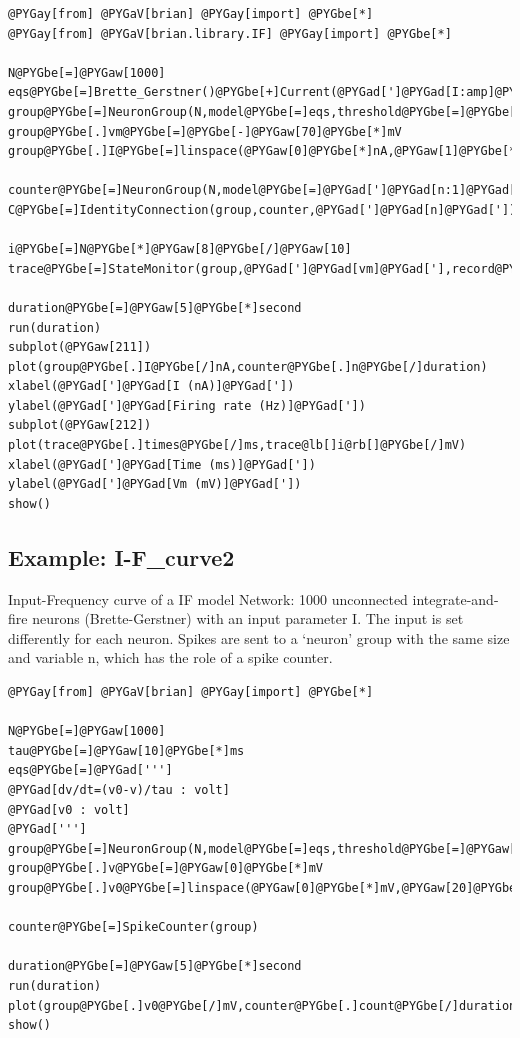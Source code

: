 \documentclass[letterpaper,10pt]{manual}
\begin{document}
\begin{Verbatim}[commandchars=@\[\]]
@PYGay[from] @PYGaV[brian] @PYGay[import] @PYGbe[*]
@PYGay[from] @PYGaV[brian.library.IF] @PYGay[import] @PYGbe[*]

N@PYGbe[=]@PYGaw[1000]
eqs@PYGbe[=]Brette_Gerstner()@PYGbe[+]Current(@PYGad[']@PYGad[I:amp]@PYGad['])
group@PYGbe[=]NeuronGroup(N,model@PYGbe[=]eqs,threshold@PYGbe[=]@PYGbe[-]@PYGaw[20]@PYGbe[*]mV,reset@PYGbe[=]AdaptiveReset())
group@PYGbe[.]vm@PYGbe[=]@PYGbe[-]@PYGaw[70]@PYGbe[*]mV
group@PYGbe[.]I@PYGbe[=]linspace(@PYGaw[0]@PYGbe[*]nA,@PYGaw[1]@PYGbe[*]nA,N)

counter@PYGbe[=]NeuronGroup(N,model@PYGbe[=]@PYGad[']@PYGad[n:1]@PYGad['])
C@PYGbe[=]IdentityConnection(group,counter,@PYGad[']@PYGad[n]@PYGad['])

i@PYGbe[=]N@PYGbe[*]@PYGaw[8]@PYGbe[/]@PYGaw[10]
trace@PYGbe[=]StateMonitor(group,@PYGad[']@PYGad[vm]@PYGad['],record@PYGbe[=]i)

duration@PYGbe[=]@PYGaw[5]@PYGbe[*]second
run(duration)
subplot(@PYGaw[211])
plot(group@PYGbe[.]I@PYGbe[/]nA,counter@PYGbe[.]n@PYGbe[/]duration)
xlabel(@PYGad[']@PYGad[I (nA)]@PYGad['])
ylabel(@PYGad[']@PYGad[Firing rate (Hz)]@PYGad['])
subplot(@PYGaw[212])
plot(trace@PYGbe[.]times@PYGbe[/]ms,trace@lb[]i@rb[]@PYGbe[/]mV)
xlabel(@PYGad[']@PYGad[Time (ms)]@PYGad['])
ylabel(@PYGad[']@PYGad[Vm (mV)]@PYGad['])
show()
\end{Verbatim}

\resetcurrentobjects
{}

\hypertarget{index-24}{}\subsection{Example: I-F\_curve2}

Input-Frequency curve of a IF model
Network: 1000 unconnected integrate-and-fire neurons (Brette-Gerstner)
with an input parameter I.
The input is set differently for each neuron.
Spikes are sent to a `neuron' group with the same size and variable n,
which has the role of a spike counter.

\begin{Verbatim}[commandchars=@\[\]]
@PYGay[from] @PYGaV[brian] @PYGay[import] @PYGbe[*]

N@PYGbe[=]@PYGaw[1000]
tau@PYGbe[=]@PYGaw[10]@PYGbe[*]ms
eqs@PYGbe[=]@PYGad[''']
@PYGad[dv/dt=(v0-v)/tau : volt]
@PYGad[v0 : volt]
@PYGad[''']
group@PYGbe[=]NeuronGroup(N,model@PYGbe[=]eqs,threshold@PYGbe[=]@PYGaw[10]@PYGbe[*]mV,reset@PYGbe[=]@PYGaw[0]@PYGbe[*]mV,refractory@PYGbe[=]@PYGaw[5]@PYGbe[*]ms)
group@PYGbe[.]v@PYGbe[=]@PYGaw[0]@PYGbe[*]mV
group@PYGbe[.]v0@PYGbe[=]linspace(@PYGaw[0]@PYGbe[*]mV,@PYGaw[20]@PYGbe[*]mV,N)

counter@PYGbe[=]SpikeCounter(group)

duration@PYGbe[=]@PYGaw[5]@PYGbe[*]second
run(duration)
plot(group@PYGbe[.]v0@PYGbe[/]mV,counter@PYGbe[.]count@PYGbe[/]duration)
show()
\end{Verbatim}
\end{document}
